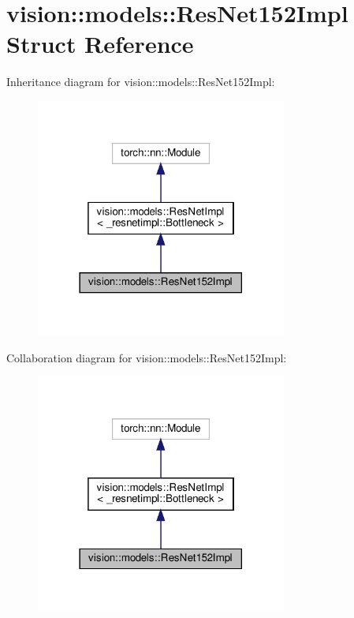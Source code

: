 \hypertarget{structvision_1_1models_1_1ResNet152Impl}{}\section{vision\+:\+:models\+:\+:Res\+Net152\+Impl Struct Reference}
\label{structvision_1_1models_1_1ResNet152Impl}


Inheritance diagram for vision\+:\+:models\+:\+:Res\+Net152\+Impl\+:
\nopagebreak
\begin{figure}[H]
\begin{center}
\leavevmode
\includegraphics[width=234pt]{structvision_1_1models_1_1ResNet152Impl__inherit__graph}
\end{center}
\end{figure}


Collaboration diagram for vision\+:\+:models\+:\+:Res\+Net152\+Impl\+:
\nopagebreak
\begin{figure}[H]
\begin{center}
\leavevmode
\includegraphics[width=234pt]{structvision_1_1models_1_1ResNet152Impl__coll__graph}
\end{center}
\end{figure}
